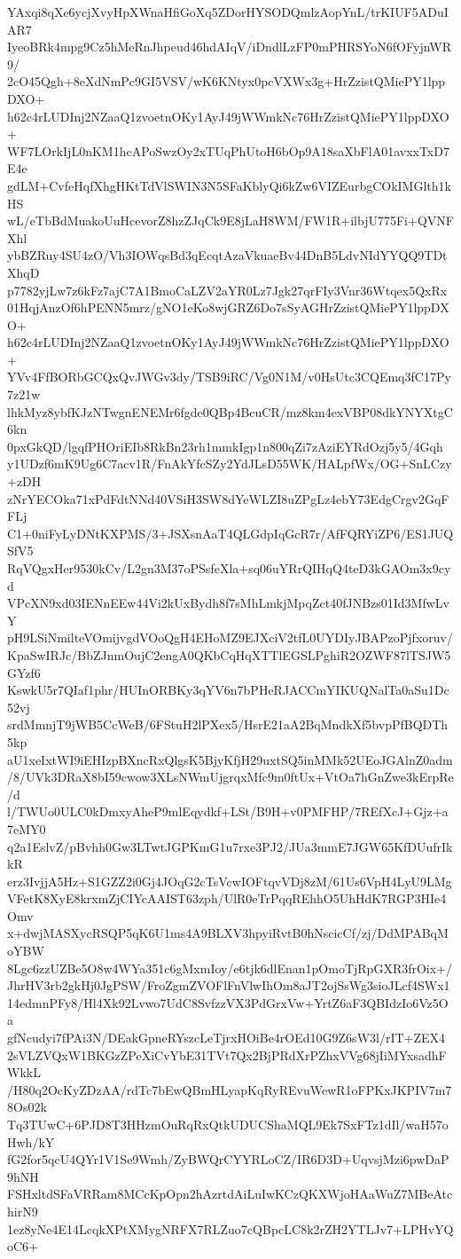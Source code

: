 YAxqi8qXe6ycjXvyHpXWnaHfiGoXq5ZDorHYSODQmlzAopYnL/trKIUF5ADuIAR7
IyeoBRk4mpg9Cz5hMeRnJhpeud46hdAIqV/iDndlLzFP0mPHRSYoN6fOFyjnWR9/
2cO45Qgh+8eXdNmPc9GI5VSV/wK6KNtyx0pcVXWx3g+HrZzistQMiePY1lppDXO+
h62c4rLUDInj2NZaaQ1zvoetnOKy1AyJ49jWWmkNc76HrZzistQMiePY1lppDXO+
WF7LOrkIjL0nKM1hcAPoSwzOy2xTUqPhUtoH6bOp9A18saXbFlA01avxxTxD7E4e
gdLM+CvfeHqfXhgHKtTdVlSWIN3N5SFaKblyQi6kZw6VIZEurbgCOkIMGlth1kHS
wL/eTbBdMuakoUuHcevorZ8hzZJqCk9E8jLaH8WM/FW1R+ilbjU775Fi+QVNFXhl
ybBZRuy4SU4zO/Vh3IOWqsBd3qEcqtAzaVkuaeBv44DnB5LdvNIdYYQQ9TDtXhqD
p7782yjLw7z6kFz7ajC7A1BmoCaLZV2aYR0Lz7Jgk27qrFIy3Vnr36Wtqex5QxRx
01HqjAnzOf6hPENN5mrz/gNO1eKo8wjGRZ6Do7sSyAGHrZzistQMiePY1lppDXO+
h62c4rLUDInj2NZaaQ1zvoetnOKy1AyJ49jWWmkNc76HrZzistQMiePY1lppDXO+
YVv4FfBORbGCQxQvJWGv3dy/TSB9iRC/Vg0N1M/v0HsUtc3CQEmq3fC17Py7z21w
lhkMyz8ybfKJzNTwgnENEMr6fgde0QBp4BcuCR/mz8km4exVBP08dkYNYXtgC6kn
0pxGkQD/lgqfPHOriEIb8RkBn23rh1mmkIgp1n800qZi7zAziEYRdOzj5y5/4Gqh
y1UDzf6mK9Ug6C7acv1R/FnAkYfcSZy2YdJLsD55WK/HALpfWx/OG+SnLCzy+zDH
zNrYECOka71xPdFdtNNd40VSiH3SW8dYeWLZI8uZPgLz4ebY73EdgCrgv2GqFFLj
C1+0niFyLyDNtKXPMS/3+JSXsnAaT4QLGdpIqGcR7r/AfFQRYiZP6/ES1JUQSfV5
RqVQgxHer9530kCv/L2gn3M37oPSsfeXla+sq06uYRrQIHqQ4teD3kGAOm3x9cyd
VPcXN9xd03IENnEEw44Vi2kUxBydh8f7sMhLmkjMpqZct40fJNBzs01Id3MfwLvY
pH9LSiNmilteVOmijvgdVOoQgH4EHoMZ9EJXciV2tfL0UYDIyJBAPzoPjfxoruv/
KpaSwIRJc/BbZJnmOujC2engA0QKbCqHqXTTlEGSLPghiR2OZWF87lTSJW5GYzf6
KswkU5r7QIaf1phr/HUInORBKy3qYV6n7bPHeRJACCmYIKUQNalTa0aSu1Dc52vj
srdMmnjT9jWB5CcWeB/6FStuH2lPXex5/HsrE21aA2BqMndkXf5bvpPfBQDTh5kp
aU1xeIxtWI9iEHIzpBXncRxQlgsK5BjyKfjH29uxtSQ5inMMk52UEoJGAlnZ0adm
/8/UVk3DRaX8bI59cwow3XLsNWmUjgrqxMfc9m0ftUx+VtOa7hGnZwe3kErpRe/d
l/TWUo0ULC0kDmxyAheP9mlEqydkf+LSt/B9H+v0PMFHP/7REfXcJ+Gjz+a7eMY0
q2a1EslvZ/pBvhh0Gw3LTwtJGPKmG1u7rxe3PJ2/JUa3mmE7JGW65KfDUufrIkkR
erz3IvjjA5Hz+S1GZZ2i0Gj4JOqG2cTsVcwIOFtqvVDj8zM/61Us6VpH4LyU9LMg
VFetK8XyE8krxmZjCIYcAAIST63zph/UlR0eTrPqqREhhO5UhHdK7RGP3HIe4Omv
x+dwjMASXycRSQP5qK6U1ms4A9BLXV3hpyiRvtB0hNscicCf/zj/DdMPABqMoYBW
8Lgc6zzUZBe5O8w4WYa351c6gMxmIoy/e6tjk6dlEnan1pOmoTjRpGXR3frOix+/
JhrHV3rb2gkHj0JgPSW/FroZgmZVOFlFnVlwIhOm8aJT2ojSsWg3sioJLcf4SWx1
14edmnPFy8/Hl4Xk92Lvwo7UdC8SvfzzVX3PdGrxVw+YrtZ6aF3QBIdzIo6Vz5Oa
gfNcudyi7fPAi3N/DEakGpneRYszcLeTjrxHOiBe4rOEd10G9Z6sW3l/rIT+ZEX4
2sVLZVQxW1BKGzZPeXiCvYbE31TVt7Qx2BjPRdXrPZhxVVg68jIiMYxsadhFWkkL
/H80q2OcKyZDzAA/rdTc7bEwQBmHLyapKqRyREvuWewR1oFPKxJKPIV7m78Os02k
Tq3TUwC+6PJD8T3HHzmOuRqRxQtkUDUCShaMQL9Ek7SxFTz1dIl/waH57oHwh/kY
fG2for5qcU4QYr1V1Se9Wmh/ZyBWQrCYYRLoCZ/IR6D3D+UqvsjMzi6pwDaP9hNH
FSHxltdSFaVRRam8MCcKpOpn2hAzrtdAiLuIwKCzQKXWjoHAaWuZ7MBeAtchirN9
1ez8yNe4E14LcqkXPtXMygNRFX7RLZuo7cQBpcLC8k2rZH2YTLJv7+LPHvYQoC6+
